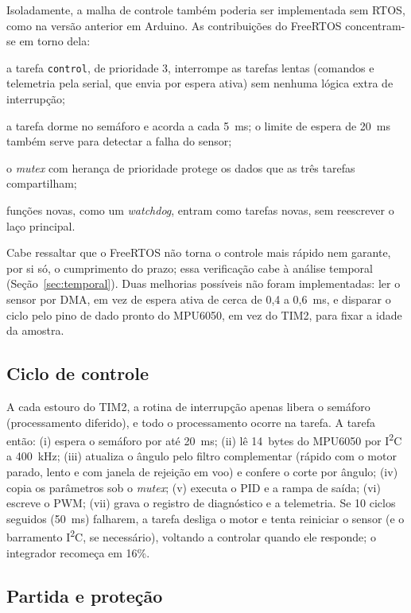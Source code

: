 Isoladamente, a malha de controle também poderia ser implementada sem RTOS, como na versão anterior em Arduino. As contribuições do FreeRTOS concentram-se em torno dela:
\begin{alineastcc}
 \item a tarefa \texttt{control}, de prioridade 3, interrompe as tarefas lentas (comandos e telemetria pela serial, que envia por espera ativa) sem nenhuma lógica extra de interrupção;
 \item a tarefa dorme no semáforo e acorda a cada 5~ms; o limite de espera de 20~ms também serve para detectar a falha do sensor;
 \item o \textit{mutex} com herança de prioridade protege os dados que as três tarefas compartilham;
 \item funções novas, como um \textit{watchdog}, entram como tarefas novas, sem reescrever o laço principal.
\end{alineastcc}
Cabe ressaltar que o FreeRTOS não torna o controle mais rápido nem garante, por si só, o cumprimento do prazo; essa verificação cabe à análise temporal (Seção~\ref{sec:temporal}). Duas melhorias possíveis não foram implementadas: ler o sensor por DMA, em vez de espera ativa de cerca de 0,4 a 0,6~ms, e disparar o ciclo pelo pino de dado pronto do MPU6050, em vez do TIM2, para fixar a idade da amostra.

\subsection{Ciclo de controle}

A cada estouro do TIM2, a rotina de interrupção apenas libera o semáforo (processamento diferido), e todo o processamento ocorre na tarefa. A tarefa então: (i) espera o semáforo por até 20~ms; (ii) lê 14~bytes do MPU6050 por I\textsuperscript{2}C a 400~kHz; (iii) atualiza o ângulo pelo filtro complementar (rápido com o motor parado, lento e com janela de rejeição em voo) e confere o corte por ângulo; (iv) copia os parâmetros sob o \textit{mutex}; (v) executa o PID e a rampa de saída; (vi) escreve o PWM; (vii) grava o registro de diagnóstico e a telemetria. Se 10 ciclos seguidos (50~ms) falharem, a tarefa desliga o motor e tenta reiniciar o sensor (e o barramento I\textsuperscript{2}C, se necessário), voltando a controlar quando ele responde; o integrador recomeça em 16\%.

\subsection{Partida e proteção}

